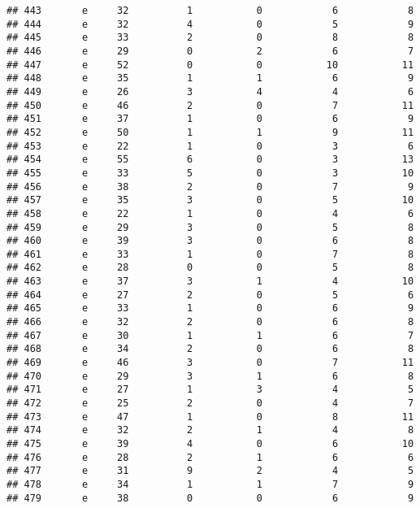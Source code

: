\documentclass[
]{article}
\begin{document}
\begin{verbatim}
## 443       e     32          1           0            6            8
## 444       e     32          4           0            5            9
## 445       e     33          2           0            8            8
## 446       e     29          0           2            6            7
## 447       e     52          0           0           10           11
## 448       e     35          1           1            6            9
## 449       e     26          3           4            4            6
## 450       e     46          2           0            7           11
## 451       e     37          1           0            6            9
## 452       e     50          1           1            9           11
## 453       e     22          1           0            3            6
## 454       e     55          6           0            3           13
## 455       e     33          5           0            3           10
## 456       e     38          2           0            7            9
## 457       e     35          3           0            5           10
## 458       e     22          1           0            4            6
## 459       e     29          3           0            5            8
## 460       e     39          3           0            6            8
## 461       e     33          1           0            7            8
## 462       e     28          0           0            5            8
## 463       e     37          3           1            4           10
## 464       e     27          2           0            5            6
## 465       e     33          1           0            6            9
## 466       e     32          2           0            6            8
## 467       e     30          1           1            6            7
## 468       e     34          2           0            6            8
## 469       e     46          3           0            7           11
## 470       e     29          3           1            6            8
## 471       e     27          1           3            4            5
## 472       e     25          2           0            4            7
## 473       e     47          1           0            8           11
## 474       e     32          2           1            4            8
## 475       e     39          4           0            6           10
## 476       e     28          2           1            6            6
## 477       e     31          9           2            4            5
## 478       e     34          1           1            7            9
## 479       e     38          0           0            6            9

\end{verbatim}
\end{document}
